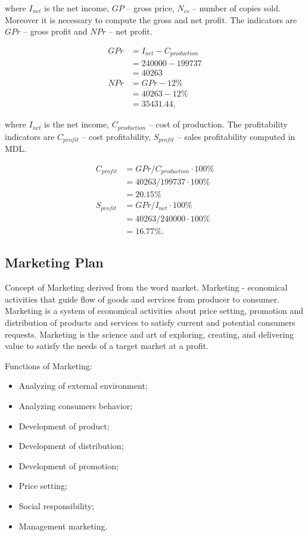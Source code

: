 \noindent
where $I_{net}$ is the net income, $GP$ -- gross price, $N_{cs}$ -- number of copies sold. Moreover it is necessary to compute the gross and net profit. The indicators are $GPr$ -- gross profit and $NPr$ -- net profit.

\begin{equation}
 \begin{split}
  GPr &= I_{net} - C_{production}\\
              &= 240000 - 199737\\
              &= 40263\\
  NPr &= GPr - 12\% \\
             &= 40263 - 12\% \\
             &= 35431.44,
 \end{split}
\end{equation}

\noindent
where $I_{net}$ is the net income, $C_{production}$ -- cost of production. The profitability indicators are $C_{profit}$ -- cost profitability, $S_{profit}$ -- sales profitability computed in MDL.

\begin{equation}
 \begin{split}
  C_{profit} &= GPr / C_{production} \cdot 100\%\\
              &= 40263 / 199737 \cdot 100\% \\
              &= 20.15 \%\\
  S_{profit} &= GPr / I_{net} \cdot 100\% \\
             &= 40263 / 240000 \cdot 100\% \\
             &= 16.77 \%.
 \end{split}
\end{equation}

\subsection{Marketing Plan}
Concept of Marketing derived from the word market. Marketing - economical activities that guide flow of goods and services from producer to consumer.  Marketing is a system of economical activities about price setting, promotion and distribution of products and services to satisfy current and potential consumers requests. Marketing is the science and art of exploring, creating, and delivering value to satisfy the needs of a target market at a profit.

 Functions of Marketing:
 \begin{itemize}
 \item Analyzing of external environment;
 \item Analyzing consumers behavior;
 \item Development of product;
 \item Development of distribution;
 \item Development of promotion;
 \item Price setting;
 \item Social responsibility;
 \item Management marketing.
\end{itemize}

